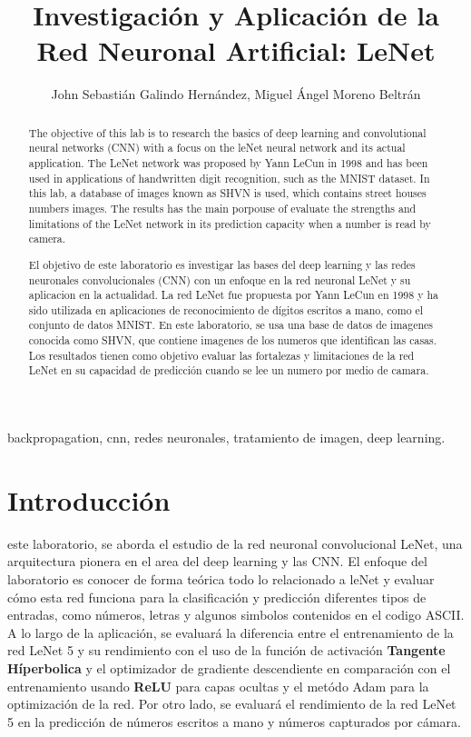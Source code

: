 \documentclass[journal]{IEEEtran}
\title{Investigación y Aplicación de la Red Neuronal Artificial: LeNet}
\author{John Sebastián Galindo Hernández, Miguel Ángel Moreno Beltrán}
\begin{document}
\maketitle

\begin{abstract}
The objective of this lab is to research the basics of deep learning
and convolutional neural networks (CNN) with a focus on the leNet neural
network and its actual application.
The LeNet network was proposed by Yann LeCun in 1998 and has been used
in applications of handwritten digit recognition, such as the MNIST dataset.
In this lab, a database of images known as SHVN is used, which contains
street houses numbers images. The results has the main porpouse of evaluate
the strengths and limitations of the LeNet network in its prediction capacity
when a number is read by camera.
\end{abstract}

\begin{abstract}
El objetivo de este laboratorio es investigar las bases del deep learning
y las redes neuronales convolucionales (CNN) con un enfoque en la red neuronal
LeNet y su aplicacion en la actualidad. 
La red LeNet fue propuesta por Yann LeCun en 1998 y ha sido utilizada 
en aplicaciones de reconocimiento de dígitos escritos a mano, 
como el conjunto de datos MNIST. En este laboratorio,
se usa una base de datos de imagenes conocida como SHVN, que contiene
imagenes de los numeros que identifican las casas. Los resultados tienen 
como objetivo evaluar las fortalezas y limitaciones de la red LeNet en su 
capacidad de predicción cuando se lee un numero por medio de camara.
\end{abstract}

\begin{IEEEkeywords}
backpropagation, cnn, redes neuronales, tratamiento de imagen, deep learning.
\end{IEEEkeywords}

\section{Introducción}
 este laboratorio, 
se aborda el estudio de la red neuronal convolucional LeNet, 
una arquitectura pionera en el area del deep learning y las CNN. 
El enfoque del laboratorio es conocer de forma teórica todo lo 
relacionado a leNet y evaluar cómo esta red funciona para la clasificación
y predicción diferentes tipos de entradas, como números, letras y algunos
simbolos contenidos en el codigo ASCII. A lo largo de la aplicación, 
se evaluará la diferencia entre el entrenamiento de la red LeNet 5 y su 
rendimiento con el uso de la función de activación 
\textbf{Tangente Híperbolica} y el optimizador de gradiente descendiente
en comparación con el entrenamiento usando \textbf{ReLU} para capas
ocultas y el metódo Adam para la optimización de la red. Por otro lado,
se evaluará el rendimiento de la red LeNet 5 en la predicción de números
escritos a mano y números capturados por cámara.







\newpage


\end{document}
